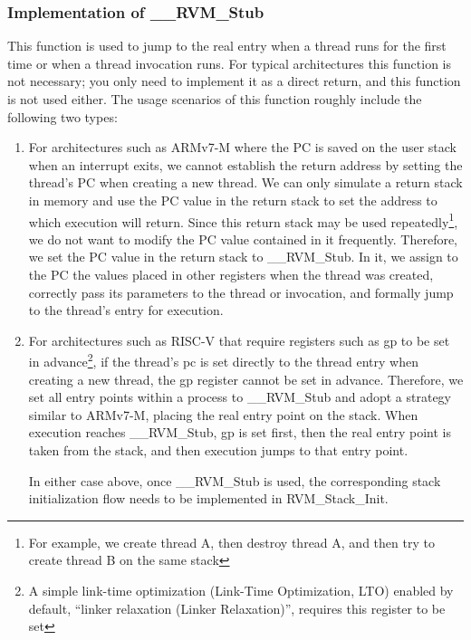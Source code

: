 \subsubsection{Implementation of \_\_RVM\_Stub}\label{subsubsec:8-2-6-2}

This function is used to jump to the real entry when a thread runs for the first time or when a thread invocation runs. For typical architectures this function is not necessary; you only need to implement it as a direct return, and this function is not used either.
The usage scenarios of this function roughly include the following two types:

\begin{enumerate}
\def\labelenumi{\arabic{enumi}.}
\item
  For architectures such as ARMv7-M where the PC is saved on the user stack when an interrupt exits, we cannot establish the return address by setting the thread's PC when creating a new thread. We can only simulate a return stack in memory and use the PC value in the return stack to set the address to which execution will return. Since this return stack may be used repeatedly\footnote{For example, we create thread A, then destroy thread A, and then try to create thread B on the same stack}, we do not want to modify the PC value contained in it frequently. Therefore, we set the PC value in the return stack to \_\_RVM\_Stub. In it, we assign to the PC the values placed in other registers when the thread was created, correctly pass its parameters to the thread or invocation, and formally jump to the thread's entry for execution.
\item
  For architectures such as RISC-V that require registers such as gp to be set in advance\footnote{A simple link-time optimization (Link-Time
    Optimization, LTO) enabled by default, ``linker
    relaxation (Linker Relaxation)'', requires this register to be set}, if the thread's pc is set directly to the thread entry when creating a new thread, the gp register cannot be set in advance. Therefore, we set all entry points within a process to \_\_RVM\_Stub and adopt a strategy similar to ARMv7-M, placing the real entry point on the stack. When execution reaches \_\_RVM\_Stub, gp is set first, then the real entry point is taken from the stack, and then execution jumps to that entry point.

  In either case above, once \_\_RVM\_Stub is used, the corresponding stack initialization flow needs to be implemented in RVM\_Stack\_Init.
\end{enumerate}

